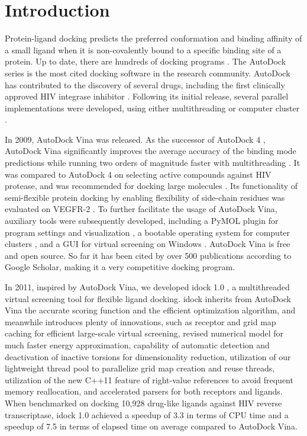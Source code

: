 \documentclass[10pt]{article}
\begin{document}
\section*{Introduction}
Protein-ligand docking predicts the preferred conformation and binding affinity of a small ligand when it is non-covalently bound to a specific binding site of a protein. Up to date, there are hundreds of docking programs \cite{493,922}. The AutoDock series is the most cited docking software in the research community. AutoDock has contributed to the discovery of several drugs, including the first clinically approved HIV integrase inhibitor \cite{1169}. Following its initial release, several parallel implementations were developed, using either multithreading or computer cluster \cite{115,560,782}.

In 2009, AutoDock Vina \cite{595} was released. As the successor of AutoDock 4 \cite{596}, AutoDock Vina significantly improves the average accuracy of the binding mode predictions while running two orders of magnitude faster with multithreading \cite{595}. It was compared to AutoDock 4 on selecting active compounds against HIV protease, and was recommended for docking large molecules \cite{556}. Its functionality of semi-flexible protein docking by enabling flexibility of side-chain residues was evaluated on VEGFR-2 \cite{1084}. To further facilitate the usage of AutoDock Vina, auxiliary tools were subsequently developed, including a PyMOL plugin for program settings and visualization \cite{609}, a bootable operating system for computer clusters \cite{773}, and a GUI for virtual screening on Windows \cite{1250}. AutoDock Vina is free and open source. So far it has been cited by over 500 publications according to Google Scholar, making it a very competitive docking program.

In 2011, inspired by AutoDock Vina, we developed idock 1.0 \cite{1153}, a multithreaded virtual screening tool for flexible ligand docking. idock inherits from AutoDock Vina the accurate scoring function and the efficient optimization algorithm, and meanwhile introduces plenty of innovations, such as receptor and grid map caching for efficient large-scale virtual screening, revised numerical model for much faster energy approximation, capability of automatic detection and deactivation of inactive torsions for dimensionality reduction, utilization of our lightweight thread pool to parallelize grid map creation and reuse threads, utilization of the new C++11 feature of right-value references to avoid frequent memory reallocation, and accelerated parsers for both receptors and ligands. When benchmarked on docking 10,928 drug-like ligands against HIV reverse transcriptase, idock 1.0 achieved a speedup of 3.3 in terms of CPU time and a speedup of 7.5 in terms of elapsed time on average compared to AutoDock Vina.
\end{document}
